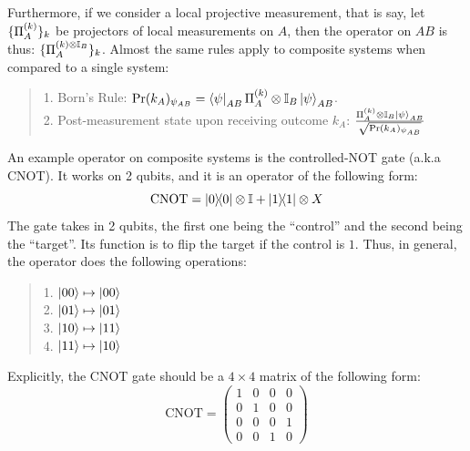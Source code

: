 Furthermore, if we consider a local projective measurement, that is say, let $\{\Pi_{A}^{(k)}\}_k$ be projectors of local measurements on $A$, then the operator on $AB$ is thus: $\{\Pi_{A}^{(k) \otimes \mathbb{I}_B}\}_k$. Almost the same rules apply to composite systems when compared to a single system:
\begin{quote}
    1. Born's Rule: $\text{Pr}(k_A)_{\psi_{AB}} = \bra{\psi}_{AB} \Pi_{A}^{(k)} \otimes \mathbb{I}_B \ket{\psi}_{AB}$. \\
    2. Post-measurement state upon receiving outcome $k_A$: $\frac{\Pi_{A}^{(k)} \otimes \mathbb{I}_B \ket{\psi}_{AB}}{\sqrt{\text{Pr}(k_A)_{\psi_{AB}}}}$
\end{quote}
An example operator on composite systems is the controlled-NOT gate (a.k.a CNOT). It works on 2 qubits, and it is an operator of the following form:
$$\text{CNOT} = \dyad{0}{0} \otimes \id + \dyad{1}{1} \otimes X$$
The gate takes in 2 qubits, the first one being the ``control'' and the second being the ``target''. Its function is to flip the target if the control is $1$. Thus, in general, the operator does the following operations:
\begin{quote}
    1. $\ket{00} \mapsto \ket{00}$ \\
    2. $\ket{01} \mapsto \ket{01}$ \\
    3. $\ket{10} \mapsto \ket{11}$ \\
    4. $\ket{11} \mapsto \ket{10}$
\end{quote}
Explicitly, the CNOT gate should be a $4 \times 4$ matrix of the following form:
$$\text{CNOT} = \begin{pmatrix}
    1 & 0 & 0 & 0 \\
    0 & 1 & 0 & 0 \\
    0 & 0 & 0 & 1 \\
    0 & 0 & 1 & 0
\end{pmatrix}$$

